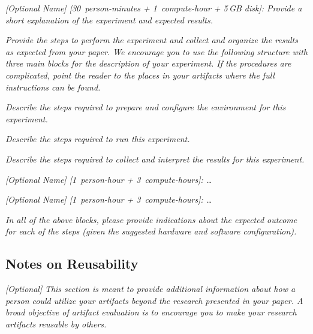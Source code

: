 \documentclass[nonacm,sigconf]{acmart}
\begin{document}
\bigskip
\begin{compactitem}
\item[(E1):]
  \emph{[Optional Name] [30~person-minutes + 1~compute-hour + 5\,GB
    disk]: Provide a short explanation of the experiment and expected
  results.}

  \emph{Provide the steps to perform the experiment and collect and
  organize the results as expected from your paper.  We encourage you
  to use the following structure with three main blocks for the
  description of your experiment.  If the procedures are complicated,
  point the reader to the places in your artifacts where the full
  instructions can be found.}

  \begin{asparadesc}
  \item[Preparation:] \emph{Describe the steps required to prepare and
  configure the environment for this experiment.}

  \item[Execution:] \emph{Describe the steps required to run this
  experiment.}

  \item[Results:] \emph{Describe the steps required to collect and
  interpret the results for this experiment.}
  \end{asparadesc}

\item[(E2):] \emph{[Optional Name] [1~person-hour + 3~compute-hours]: \ldots}

\item[(E3):] \emph{[Optional Name] [1~person-hour + 3~compute-hours]: \ldots}
\end{compactitem}
\bigskip

\emph{In all of the above blocks, please provide indications about the
expected outcome for each of the steps (given the suggested hardware
and software configuration).}


\subsection{Notes on Reusability}

\emph{[Optional]}
%
\emph{This section is meant to provide additional information about
how a person could utilize your artifacts beyond the research
presented in your paper.  A broad objective of artifact evaluation is
to encourage you to make your research artifacts reusable by others.}
\end{document}
